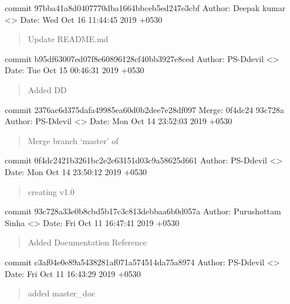 \documentclass[letterpaper,10pt,english]{sphinxmanual}
\begin{document}
commit 97bba41a8d0407770dba1664bbceb5ed247e3cbf
Author: Deepak kumar \textless{}\textgreater{}
Date:   Wed Oct 16 11:44:45 2019 +0530
\begin{quote}

Update README.md
\end{quote}

commit b95df63007ed07f8e60896128cf40bb3927e8ced
Author: PS-Ddevil \textless{}\textgreater{}
Date:   Tue Oct 15 00:46:31 2019 +0530
\begin{quote}

Added DD
\end{quote}

commit 2376ac6d375dafa49985ea60d0b2dee7e28df097
Merge: 0f4dc24 93c728a
Author: PS-Ddevil \textless{}\textgreater{}
Date:   Mon Oct 14 23:52:03 2019 +0530
\begin{quote}

Merge branch ‘master’ of 
\end{quote}

commit 0f4dc2421b3261bc2e2e63151d03c9a58625d661
Author: PS-Ddevil \textless{}\textgreater{}
Date:   Mon Oct 14 23:50:12 2019 +0530
\begin{quote}

creating v1.0
\end{quote}

commit 93c728a33e0b8cbd5b17c3c813debbaa6b0d057a
Author: Purushottam Sinha \textless{}\textgreater{}
Date:   Fri Oct 11 16:47:41 2019 +0530
\begin{quote}

Added Documentation Reference
\end{quote}

commit c3af04e0e89a5438281af071a574514da75a8974
Author: PS-Ddevil \textless{}\textgreater{}
Date:   Fri Oct 11 16:43:29 2019 +0530
\begin{quote}

added master\_doc
\end{quote}
\end{document}
